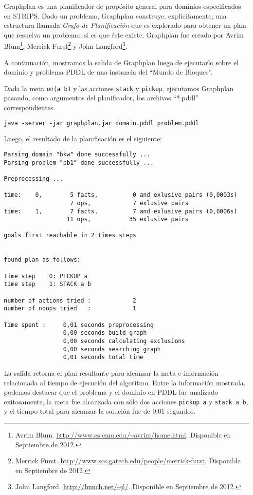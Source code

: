 Graphplan es una planificador de prop\'osito general para dominios
especificados en STRIPS. Dado un problema, Graphplan
construye, expl\'icitamente, una estructura llamada
\emph{Grafo de Pla\-ni\-fi\-ca\-ci\'on} que es explorado para obtener un plan
que resuelva un problema, si es que \'este existe. Graphplan
fue creado por Avrim Blum\footnote{Avrim
  Blum. \url{http://www.cs.cmu.edu/~avrim/home.html}. Disponible en
  Septiembre de 2012.}, 
Merrick Furst\footnote{Merrick
  Furst. \url{http://www.scs.gatech.edu/people/merrick-furst}. Disponible
en Septiembre de 2012.} 
y John Langford\footnote{John 
Langford. \url{http://hunch.net/~jl/}. Disponible en Septiembre de 2012.}.

A continuaci\'on, mostramos la salida de Graphplan
luego de ejecutarlo sobre el dominio y problema
PDDL de una instancia del ``Mundo de Bloques''.

\begin{ejemplo}%

Dada la meta \texttt{on(a b)} y las acciones
\texttt{stack} y \texttt{pickup},
ejecutamos Graphplan pasando, como argumentos
del planificador, los archivos ``*.pddl'' correspondientes.

 \begin{verbatim}
java -server -jar graphplan.jar domain.pddl problem.pddl
 \end{verbatim}

Luego, el resultado de la planificaci\'on es el siguiente:

 \begin{verbatim}
Parsing domain "bkw" done successfully ...
Parsing problem "pb1" done successfully ...

Preprocessing ...

time:    0,        5 facts,          0 and exlusive pairs (0,0003s)
                   7 ops,            7 exlusive pairs
time:    1,        7 facts,          7 and exlusive pairs (0,0006s)
                  11 ops,           35 exlusive pairs

goals first reachable in 2 times steps


found plan as follows:

time step    0: PICKUP a
time step    1: STACK a b

number of actions tried :            2 
number of noops tried   :            1 

Time spent :     0,01 seconds preprocessing 
                 0,00 seconds build graph 
                 0,00 seconds calculating exclusions 
                 0,00 seconds searching graph 
                 0,01 seconds total time 

 \end{verbatim}

La salida retorna el plan resultante para alcanzar
la meta e informaci\'on relacionada al tiempo de ejecuci\'on
del algoritmo. Entre la informaci\'on mostrada, podemos destacar
que el problema y el dominio en PDDL fue analizado exitosamente, 
la meta fue alcanzada con s\'olo dos acciones \texttt{pickup a} y
\texttt{stack a b}, y el tiempo
total para alcanzar la soluci\'on fue de 0.01 segundos.
\end{ejemplo}

